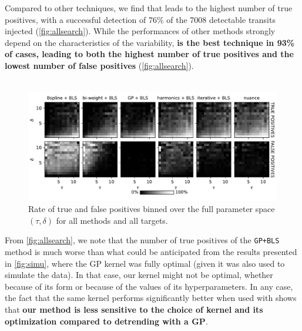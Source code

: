 \documentclass[modern]{aastex631}
\begin{document}
Compared to other techniques, we find that \nuancecode{} leads to the highest number of true positives, with a successful detection of 76\% of the 7008 detectable transits injected (\autoref{fig:allsearch}). While the performances of other methods strongly depend on the characteristics of the variability, \textbf{\nuancecode{} is the best technique in 93\% of cases, leading to both the highest number of true positives and the lowest number of false positives} (\autoref{fig:allsearch}).\\\\
\begin{figure}[H]
    \begin{centering}
        \includegraphics[width=\linewidth]{./tpfp_ims.pdf}
        \caption{Rate of true and false positives binned over the full parameter space $(\tau, \delta)$ for all methods and all targets. }
        \label{fig:allsearchim}
    \end{centering}
\end{figure}
From \autoref{fig:allsearch}, we note that the number of true positives of the \texttt{GP+BLS} method is much worse than what could be anticipated from the results presented in \autoref{fig:simu}, where the GP kernel was fully optimal (given it was also used to simulate the data). In that case, our kernel might not be optimal, whether because of its form or because of the values of its hyperparameters. In any case, the fact that the same kernel performs significantly better when used with \nuancecode{} shows that \textbf{our method is less sensitive to the choice of kernel and its optimization compared to detrending with a GP}.\\\\
\end{document}
